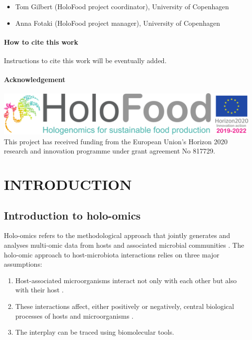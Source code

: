 \documentclass[
]{book}
\providecommand{\tightlist}{%
  \setlength{\itemsep}{0pt}\setlength{\parskip}{0pt}}
\begin{document}
\begin{itemize}
\tightlist
\item
  Tom Gilbert (HoloFood project coordinator), University of Copenhagen
\item
  Anna Fotaki (HoloFood project manager), University of Copenhagen
\end{itemize}

\hypertarget{how-to-cite-this-work}{%
\subsection*{How to cite this work}\label{how-to-cite-this-work}}

Instructions to cite this work will be eventually added.

\hypertarget{acknowledgement}{%
\subsection*{Acknowledgement}\label{acknowledgement}}

\includegraphics{images/holofood_logo_large.png}
This project has received funding from the European Union's Horizon 2020 research and innovation programme under grant agreement No 817729.

\hypertarget{part-introduction}{%
\part{INTRODUCTION}\label{part-introduction}}

\hypertarget{holo-omics}{%
\chapter{Introduction to holo-omics}\label{holo-omics}}

Holo-omics refers to the methodological approach that jointly generates and analyses multi-omic data from hosts and associated microbial communities \citep{Nyholm2020-ua}. The holo-omic approach to host-microbiota interactions relies on three major assumptions:

\begin{enumerate}
\def\labelenumi{\arabic{enumi}.}
\tightlist
\item
  Host-associated microorganisms interact not only with each other but also with their host \citep{Fischer2017-wa}.
\item
  These interactions affect, either positively or negatively, central biological processes of hosts and microorganisms \citep{Wu2012-jt}.
\item
  The interplay can be traced using biomolecular tools.
\end{enumerate}
\end{document}
